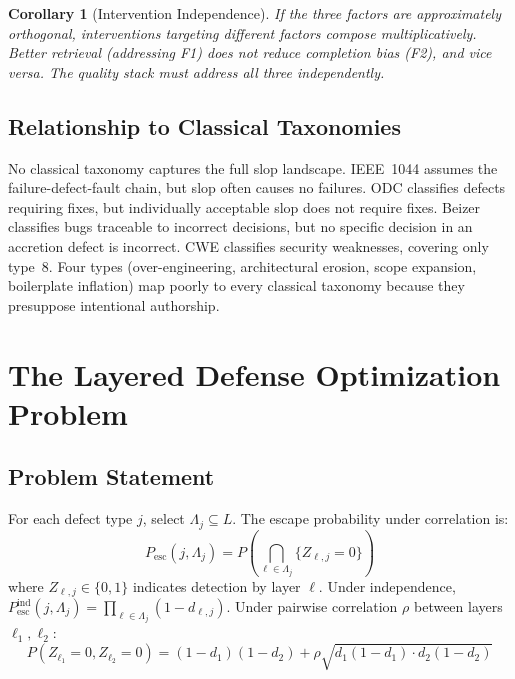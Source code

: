 \documentclass[11pt, a4paper]{article}
\newtheorem{corollary}[theorem]{Corollary}
\theoremstyle{definition}
\theoremstyle{remark}
\newcommand{\Pesc}{P_{\mathrm{esc}}}
\begin{document}
\begin{corollary}[Intervention Independence]
If the three factors are approximately orthogonal, interventions targeting different factors compose multiplicatively. Better retrieval (addressing F1) does not reduce completion bias (F2), and vice versa. The quality stack must address all three independently.
\end{corollary}

\subsection{Relationship to Classical Taxonomies}

No classical taxonomy captures the full slop landscape. IEEE~1044 \citep{ieee1044} assumes the failure-defect-fault chain, but slop often causes no failures. ODC \citep{chillarege1992} classifies defects requiring fixes, but individually acceptable slop does not require fixes. Beizer \citep{beizer1990} classifies bugs traceable to incorrect decisions, but no specific decision in an accretion defect is incorrect. CWE classifies security weaknesses, covering only type~8. Four types (over-engineering, architectural erosion, scope expansion, boilerplate inflation) map poorly to every classical taxonomy because they presuppose intentional authorship.


\section{The Layered Defense Optimization Problem}
\label{sec:optimization}

\subsection{Problem Statement}

For each defect type $j$, select $\Lambda_j \subseteq L$. The escape probability under correlation is:
\begin{equation}
\label{eq:pesc}
\Pesc(j, \Lambda_j) = P\!\left(\bigcap_{\ell \in \Lambda_j} \{Z_{\ell,j} = 0\}\right)
\end{equation}
where $Z_{\ell,j} \in \{0,1\}$ indicates detection by layer $\ell$. Under independence, $\Pesc^{\mathrm{ind}}(j, \Lambda_j) = \prod_{\ell \in \Lambda_j} (1 - d_{\ell,j})$. Under pairwise correlation $\rho$ between layers $\ell_1, \ell_2$:
\begin{equation}
P(Z_{\ell_1} = 0, Z_{\ell_2} = 0) = (1-d_1)(1-d_2) + \rho\sqrt{d_1(1-d_1) \cdot d_2(1-d_2)}
\end{equation}
\end{document}
